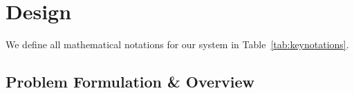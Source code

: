 \section{Design}
\label{sec:methodology}


We define all mathematical notations for our system in Table~\ref{tab:keynotations}.

\subsection{Problem Formulation \& Overview}


  
